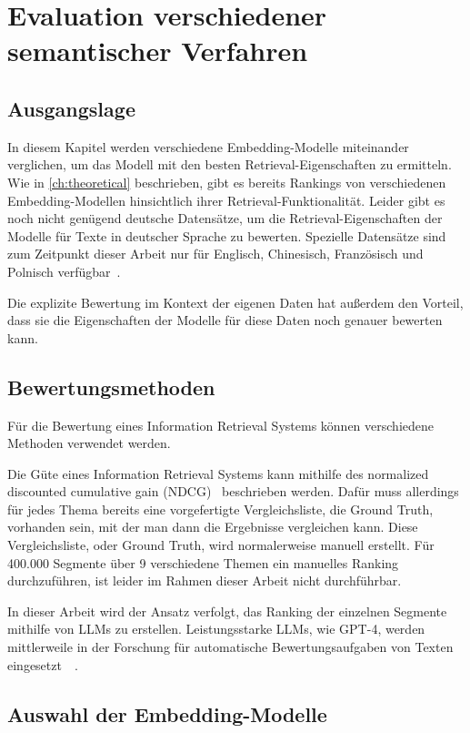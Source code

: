 \chapter{Evaluation verschiedener semantischer Verfahren}\label{ch:experiments}

\section{Ausgangslage}

In diesem Kapitel werden verschiedene Embedding-Modelle miteinander verglichen, um das Modell mit den besten Retrieval-Eigenschaften zu ermitteln.
Wie in \autoref{ch:theoretical} beschrieben, gibt es bereits Rankings von verschiedenen Embedding-Modellen hinsichtlich ihrer Retrieval-Funktionalität.
Leider gibt es noch nicht genügend deutsche Datensätze, um die Retrieval-Eigenschaften der Modelle für Texte in deutscher Sprache zu bewerten.
Spezielle Datensätze sind zum Zeitpunkt dieser Arbeit nur für Englisch, Chinesisch, Französisch und Polnisch verfügbar~\cite{mteb}.

Die explizite Bewertung im Kontext der eigenen Daten hat außerdem den Vorteil, dass sie die Eigenschaften der Modelle für diese Daten noch genauer bewerten kann.


\section{Bewertungsmethoden}
Für die Bewertung eines Information Retrieval Systems können verschiedene Methoden verwendet werden.

Die Güte eines Information Retrieval Systems kann mithilfe des normalized discounted cumulative gain (NDCG)~\cite{dupret2011} beschrieben werden. 
Dafür muss allerdings für jedes Thema bereits eine vorgefertigte Vergleichsliste, die Ground Truth, vorhanden sein, mit der man dann die Ergebnisse vergleichen kann.
Diese Vergleichsliste, oder Ground Truth, wird normalerweise manuell erstellt.
Für 400.000 Segmente über 9 verschiedene Themen ein manuelles Ranking durchzuführen, ist leider im Rahmen dieser Arbeit nicht durchführbar.

In dieser Arbeit wird der Ansatz verfolgt, das Ranking der einzelnen Segmente mithilfe von LLMs zu erstellen.
Leistungsstarke LLMs, wie GPT-4, werden mittlerweile in der Forschung für automatische Bewertungsaufgaben von Texten eingesetzt~\cite{naismith2023}~\cite{nilsson2023}.


\section{Auswahl der Embedding-Modelle}


